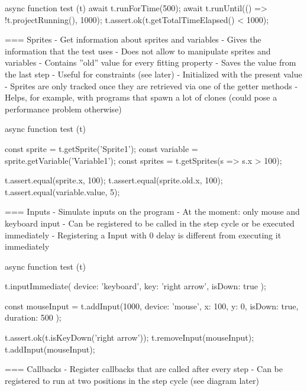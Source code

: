 \begin{javascriptcode}
    async function test (t) {
        await t.runForTime(500);
        await t.runUntil(() => !t.projectRunning(), 1000);
        t.assert.ok(t.getTotalTimeElapsed() < 1000);
    }
\end{javascriptcode}

=== Sprites
- Get information about sprites and variables
- Gives the information that the test uses
- Does not allow to manipulate sprites and variables
- Contains ''old'' value for every fitting property
    - Saves the value from the last step
    - Useful for constraints (see later)
    - Initialized with the present value
- Sprites are only tracked once they are retrieved via one of the getter methods
- Helps, for example, with programs that spawn a lot of clones (could pose a performance problem otherwise)

\begin{javascriptcode}
    async function test (t) {
        const sprite = t.getSprite('Sprite1');
        const variable = sprite.getVariable('Variable1');
        const sprites = t.getSprites(s => s.x > 100);

        t.assert.equal(sprite.x, 100);
        t.assert.equal(sprite.old.x, 100);
        t.assert.equal(variable.value, 5);
    }
\end{javascriptcode}

=== Inputs
- Simulate inputs on the program
- At the moment: only mouse and keyboard input
- Can be registered to be called in the step cycle or be executed immediately
- Registering a Input with 0 delay is different from executing it immediately

\begin{javascriptcode}
    async function test (t) {
        t.inputImmediate({
            device: 'keyboard',
            key: 'right arrow',
            isDown: true
        });

        const mouseInput = t.addInput(1000, {
            device: 'mouse',
            x: 100,
            y: 0,
            isDown: true,
            duration: 500
        });

        t.assert.ok(t.isKeyDown('right arrow'));
        t.removeInput(mouseInput);
        t.addInput(mouseInput);
    }
\end{javascriptcode}

=== Callbacks
- Register callbacks that are called after every step
- Can be registered to run at two positions in the step cycle (see diagram later)

